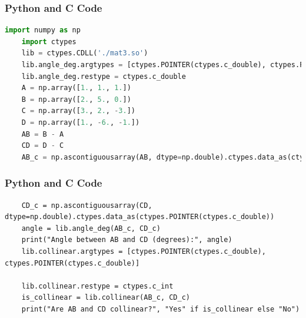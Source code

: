 \documentclass{beamer}
\begin{document}
\begin{frame}[fragile]
\frametitle{Python and C Code}
\begin{lstlisting}[language=Python]
    import numpy as np
    import ctypes
    lib = ctypes.CDLL('./mat3.so')
    lib.angle_deg.argtypes = [ctypes.POINTER(ctypes.c_double), ctypes.POINTER(ctypes.c_double)]
    lib.angle_deg.restype = ctypes.c_double
    A = np.array([1., 1., 1.])
    B = np.array([2., 5., 0.])
    C = np.array([3., 2., -3.])
    D = np.array([1., -6., -1.])                          
    AB = B - A
    CD = D - C
    AB_c = np.ascontiguousarray(AB, dtype=np.double).ctypes.data_as(ctypes.POINTER(ctypes.c_double))
    \end{lstlisting} 
    \end{frame}
    \begin{frame}[fragile]
    \frametitle{Python and C Code}

    \begin{lstlisting}
    CD_c = np.ascontiguousarray(CD, dtype=np.double).ctypes.data_as(ctypes.POINTER(ctypes.c_double))
    angle = lib.angle_deg(AB_c, CD_c)
    print("Angle between AB and CD (degrees):", angle)
    lib.collinear.argtypes = [ctypes.POINTER(ctypes.c_double), ctypes.POINTER(ctypes.c_double)]
    
    lib.collinear.restype = ctypes.c_int
    is_collinear = lib.collinear(AB_c, CD_c)
    print("Are AB and CD collinear?", "Yes" if is_collinear else "No")
    \end{lstlisting}
    \end{frame}
\end{document}
